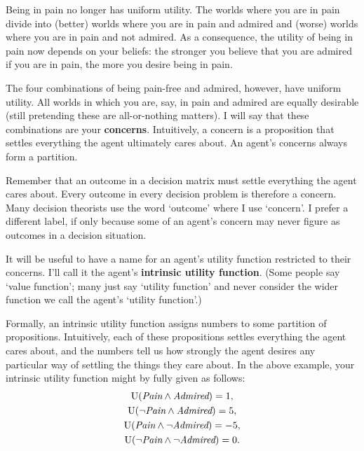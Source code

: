 Being in pain no longer has uniform utility. The worlds where you are in pain
divide into (better) worlds where you are in pain and admired and (worse) worlds
where you are in pain and not admired. As a consequence, the utility of being in
pain now depends on your beliefs: the stronger you believe that you are admired
if you are in pain, the more you desire being in pain.

The four combinations of being pain-free and admired, however, have uniform
utility. All worlds in which you are, say, in pain and admired are equally
desirable (still pretending these are all-or-nothing matters). I will say that
these combinations are your \textbf{concerns}. Intuitively, a concern is a
proposition that settles everything the agent ultimately cares about. An agent's
concerns always form a partition.

Remember that an outcome in a decision matrix must settle everything the agent
cares about. Every outcome in every decision problem is therefore a concern.
Many decision theorists use the word `outcome' where I use `concern'. I prefer a
different label, if only because some of an agent's concern may never figure as
outcomes in a decision situation.

It will be useful to have a name for an agent's utility function restricted to
their concerns. I'll call it the agent's \textbf{intrinsic utility function}.
(Some people say `value function'; many just say `utility function' and never
consider the wider function we call the agent's `utility function'.)

Formally, an intrinsic utility function assigns numbers to some partition of
propositions. Intuitively, each of these propositions settles everything the
agent cares about, and the numbers tell us how strongly the agent desires any
particular way of settling the things they care about. In the above example,
your intrinsic utility function might by fully given as follows:
\begin{gather*}
  \text{U}(\emph{Pain} \land \emph{Admired}) = 1,\\
  \text{U}(\neg\emph{Pain} \land \emph{Admired}) = 5,\\
  \text{U}(\emph{Pain} \land \neg \emph{Admired}) = -5,\\
  \text{U}(\neg \emph{Pain} \land \neg \emph{Admired}) = 0.
\end{gather*}

